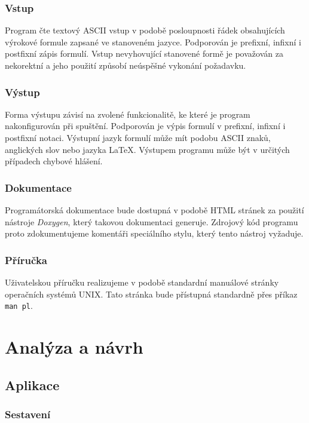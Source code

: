 \documentclass[thesis=B,czech,hidelinks]{FITthesis}[2012/06/26]
\begin{document}
\subsection{Vstup}

Program čte textový ASCII vstup v podobě posloupnosti řádek obsahujících výrokové formule zapsané ve stanoveném jazyce. Podporován je prefixní, infixní i postfixní zápis formulí. Vstup nevyhovující stanovené formě je považován za nekorektní a jeho použití způsobí neúspěšné vykonání požadavku.

\subsection{Výstup}

Forma výstupu závisí na zvolené funkcionalitě, ke které je program nakonfigurován při spuštění. Podporován je výpis formulí v prefixní, infixní i postfixní notaci. Výstupní jazyk formulí může mít podobu ASCII znaků, anglických slov nebo jazyka LaTeX. Výstupem programu může být v určitých případech chybové hlášení.

\subsection{Dokumentace}

Programátorská dokumentace bude dostupná v podobě HTML stránek za použití nástroje \emph{Doxygen}, který takovou dokumentaci generuje. Zdrojový kód programu proto zdokumentujeme komentáři speciálního stylu, který tento nástroj vyžaduje.

\subsection{Příručka}

Uživatelskou příručku realizujeme v podobě standardní manuálové stránky operačních systémů UNIX. Tato stránka bude přístupná standardně přes příkaz \texttt{man pl}.

%
%
%

\chapter{Analýza a návrh}

\section{Aplikace}

\subsection{Sestavení}
\end{document}
